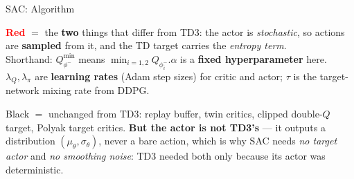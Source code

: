\begin{frame}{SAC: Algorithm}
\begin{center}
{\scriptsize\textbf{\textcolor{red}{Red}} $=$ the \textbf{two} things that differ from TD3: the actor is \emph{stochastic}, so actions are \textbf{sampled} from it, and the TD target carries the \emph{entropy term}.\\
Shorthand: $Q^{\min}_{\phi^{-}}$ means $\min_{i=1,2} Q_{\phi^{-}_i}$.\quad $\alpha$ is a \textbf{fixed hyperparameter} here.\quad
$\lambda_Q,\lambda_\pi$ are \textbf{learning rates} (Adam step sizes) for critic and actor; $\tau$ is the target-network mixing rate from DDPG.}
\end{center}
\begin{center}
\end{center}
\vspace{-0.2em}
{\scriptsize Black $=$ unchanged from TD3: replay buffer, twin critics, clipped double-$Q$ target, Polyak target critics. \textbf{But the actor is not TD3's} --- it outputs a distribution $(\mu_\theta,\sigma_\theta)$, never a bare action, which is why SAC needs \emph{no target actor} and \emph{no smoothing noise}: TD3 needed both only because its actor was deterministic.}
\end{frame}
